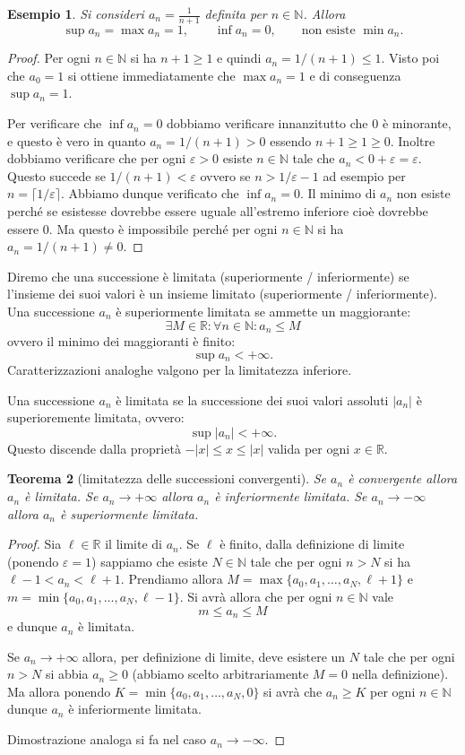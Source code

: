 \documentclass[italian,a4paper,oneside,headinclude]{scrbook}
\newcommand{\eps}{\varepsilon}
\newcommand{\NN}{\mathbb N}
\newcommand{\RR}{\mathbb R}
\newcommand{\abs}[1]{{\left|#1\right|}}
\newtheorem{theorem}{Teorema}
\newtheorem{example}[theorem]{Esempio}
\begin{document}
\begin{example}
Si consideri $a_n = \frac{1}{n+1}$ definita per $n\in \NN$.
Allora
\[
  \sup a_n = \max a_n = 1, \qquad
  \inf a_n = 0, \qquad \text{non esiste }\min a_n.
\]
\end{example}
\begin{proof}
Per ogni $n \in \NN$ si ha $n+1\ge 1$ e quindi $a_n = 1/(n+1) \le 1$.
Visto poi che $a_0 = 1$ si ottiene immediatamente che $\max a_n = 1$
e di conseguenza $\sup a_n = 1$.

Per verificare che $\inf a_n = 0$ dobbiamo verificare innanzitutto
che $0$ è minorante, e questo è vero in quanto $a_n = 1/(n+1)> 0$ essendo $n+1\ge 1 \ge 0$.
Inoltre dobbiamo verificare che per ogni $\eps >0$ esiste $n\in \NN$ tale
che $a_n < 0 + \eps = \eps$. Questo succede se $1/(n+1) < \eps$ ovvero
se $n > 1/\eps -1$ ad esempio per $n=\lceil 1/\eps\rceil$.
Abbiamo dunque verificato che $\inf a_n = 0$.
Il minimo di $a_n$ non esiste perché se esistesse dovrebbe essere uguale
all'estremo inferiore cioè dovrebbe essere $0$. Ma questo è impossibile
perché per ogni $n\in \NN$ si ha $a_n = 1/(n+1)\neq 0$.
\end{proof}

Diremo che una successione è limitata (superiormente / inferiormente) se
 l'insieme dei suoi valori
è un insieme limitato (superiormente / inferiormente).
Una successione $a_n$ è superiormente limitata se ammette un maggiorante:
\[
  \exists M\in \RR\colon \forall n \in \NN\colon a_n \le M
\]
ovvero il minimo dei maggioranti è finito:
\[
  \sup a_n < +\infty.
\]
Caratterizzazioni analoghe valgono per la limitatezza inferiore.

Una successione $a_n$
è limitata se la successione dei suoi valori assoluti $\abs{a_n}$ è superioremente limitata, ovvero:
\[
  \sup \abs{a_n} < +\infty.
\]
Questo discende dalla proprietà $-\abs{x} \le x \le \abs{x}$ valida
per ogni $x\in \RR$.

\begin{theorem}[limitatezza delle successioni convergenti]
Se $a_n$ è convergente allora $a_n$ è limitata.
Se $a_n\to +\infty$ allora $a_n$ è inferiormente limitata.
Se $a_n\to -\infty$ allora $a_n$ è superiormente limitata.
\end{theorem}
%
\begin{proof}
Sia $\ell \in \RR$ il limite di $a_n$.
Se $\ell$ è finito,
dalla definizione di limite (ponendo $\eps=1$) sappiamo che esiste $N\in \NN$
tale che per ogni $n> N$ si ha $\ell -1 < a_n < \ell+ 1$.
Prendiamo allora $M=\max\{a_0, a_1, \dots, a_N, \ell +1\}$
e $m =\min \{a_0, a_1, \dots, a_N, \ell-1\}$. Si avrà allora
che per ogni $n\in \NN$ vale
\[
  m \le a_n \le M
\]
e dunque $a_n$ è limitata.

Se $a_n \to +\infty$ allora, per definizione di limite, deve
esistere un $N$ tale che per ogni $n>N$ si abbia $a_n \ge 0$ (abbiamo
scelto arbitrariamente $M=0$ nella definizione). Ma allora
ponendo $K=\min\{a_0, a_1, \dots, a_N, 0\}$ si avrà che $a_n\ge K$ per ogni $n\in \NN$ dunque $a_n$ è inferiormente limitata.

Dimostrazione analoga si fa nel caso $a_n \to -\infty$.
\end{proof}
\end{document}
